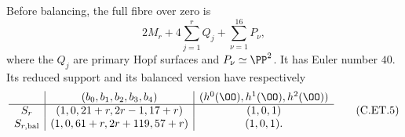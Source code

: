 \begin{proposition}
Before balancing, the full fibre over zero is
\[
                  2M_r+4\sum_{j=1}^rQ_j
                           +\sum_{\nu=1}^{16}P_\nu,
                                                               \tag{C.ET.4}\label{cdp:eq:C.ET.4}
\]
where the $Q_j$ are primary Hopf surfaces and
$P_\nu\simeq\PP^2$. It has Euler number $40$.
Its reduced support and its balanced version
have respectively
\[
 \begin{array}{c|c|c}
 &(b_0,b_1,b_2,b_3,b_4)&
                 (h^0(\OO),h^1(\OO),h^2(\OO))\\ \hline
 S_r&(1,0,21+r,2r-1,17+r)&(1,0,1)\\
 S_{r,\mathrm{bal}}&(1,0,61+r,2r+119,57+r)&(1,0,1).
 \end{array}                                             \tag{C.ET.5}\label{cdp:eq:C.ET.5}
\]
\end{proposition}

